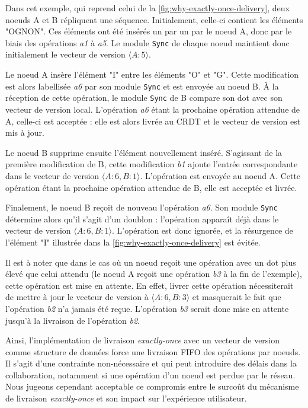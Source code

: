 Dans cet exemple, qui reprend celui de la \autoref{fig:why-exactly-once-delivery}, deux noeuds A et B répliquent une séquence.
Initialement, celle-ci contient les éléments "OGNON".
Ces éléments ont été insérés un par un par le noeud A, donc par le biais des opérations \emph{a1} à \emph{a5}.
Le module \texttt{Sync} de chaque noeud maintient donc initialement le vecteur de version $\langle A:5 \rangle$.

Le noeud A insère l'élément "I" entre les éléments "O" et "G".
Cette modification est alors labellisée \emph{a6} par son module \texttt{Sync} et est envoyée au noeud B.
À la réception de cette opération, le module \texttt{Sync} de B compare son dot avec son vecteur de version local.
L'opération \emph{a6} étant la prochaine opération attendue de A, celle-ci est acceptée : elle est alors livrée au \ac{CRDT} et le vecteur de version est mis à jour.

Le noeud B supprime ensuite l'élément nouvellement inséré.
S'agissant de la première modification de B, cette modification \emph{b1} ajoute l'entrée correspondante dans le vecteur de version $\langle A:6, B:1 \rangle$.
L'opération est envoyée au noeud A.
Cette opération étant la prochaine opération attendue de B, elle est acceptée et livrée.

Finalement, le noeud B reçoit de nouveau l'opération \emph{a6}.
Son module \texttt{Sync} détermine alors qu'il s'agit d'un doublon : l'opération apparaît déjà dans le vecteur de version $\langle A:6, B:1 \rangle$.
L'opération est donc ignorée, et la résurgence de l'élément "I" illustrée dans la \autoref{fig:why-exactly-once-delivery} est évitée.

Il est à noter que dans le cas où un noeud reçoit une opération avec un dot plus élevé que celui attendu (\eg le noeud A reçoit une opération \emph{b3} à la fin de l'exemple), cette opération est mise en attente.
En effet, livrer cette opération nécessiterait de mettre à jour le vecteur de version à $\langle A:6,B:3 \rangle$ et masquerait le fait que l'opération \emph{b2} n'a jamais été reçue.
L'opération \emph{b3} serait donc mise en attente jusqu'à la livraison de l'opération \emph{b2}.

Ainsi, l'implémentation de livraison \emph{exactly-once} avec un vecteur de version comme structure de données force une livraison \ac{FIFO} des opérations par noeuds.
Il s'agit d'une contrainte non-nécessaire et qui peut introduire des délais dans la collaboration, notamment si une opération d'un noeud est perdue par le réseau.
Nous jugeons cependant acceptable ce compromis entre le surcoût du mécanisme de livraison \emph{exactly-once} et son impact sur l'expérience utilisateur.

